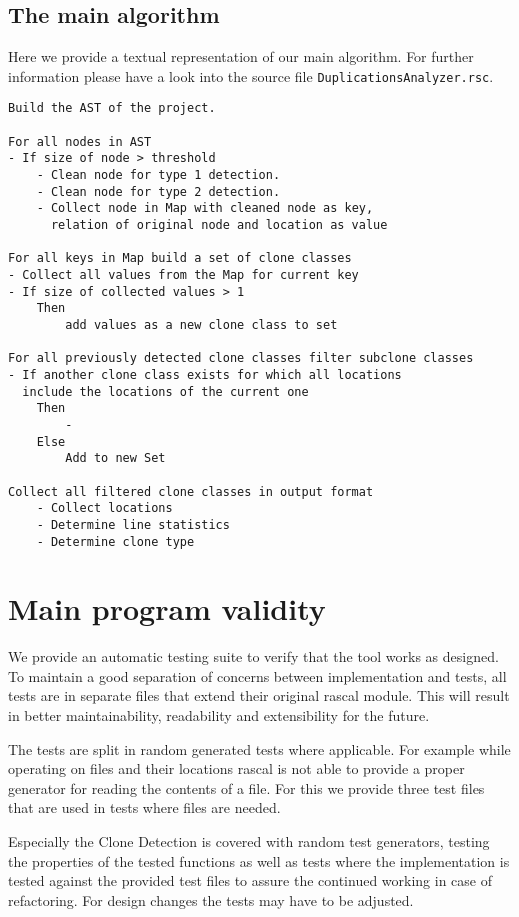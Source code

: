 \documentclass{uva-inf-article}
\begin{document}
\subsection{The main algorithm}

Here we provide a textual representation of our main algorithm. For further information please have a look into the source file \texttt{DuplicationsAnalyzer.rsc}.

\begin{lstlisting}
Build the AST of the project.

For all nodes in AST 
- If size of node > threshold
	- Clean node for type 1 detection.
	- Clean node for type 2 detection.
	- Collect node in Map with cleaned node as key, 
  	  relation of original node and location as value

For all keys in Map build a set of clone classes
- Collect all values from the Map for current key
- If size of collected values > 1 
	Then 
		add values as a new clone class to set

For all previously detected clone classes filter subclone classes
- If another clone class exists for which all locations 
  include the locations of the current one 
 	Then
		-
	Else
		Add to new Set

Collect all filtered clone classes in output format
	- Collect locations
	- Determine line statistics
	- Determine clone type

\end{lstlisting}

\section{Main program validity}

We provide an automatic testing suite to verify that the tool works as designed. To maintain a good separation of concerns between implementation and tests, all tests are in separate files that extend their original rascal module. This will result in better maintainability, readability and extensibility for the future. 

The tests are split in random generated tests where applicable. For example while operating on files and their locations rascal is not able to provide a proper generator for reading the contents of a file. For this we provide three test files that are used in tests where files are needed. 

Especially the Clone Detection is covered with random test generators, testing the properties of the tested functions as well as tests where the implementation is tested against the provided test files to assure the continued working in case of refactoring. For design changes the tests may have to be adjusted.
\end{document}
